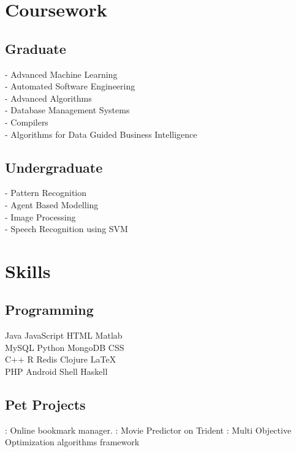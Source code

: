 \documentclass[]{bigfatnoob-resume}
\begin{document}
\begin{minipage}[t]{0.33\textwidth}

\section{Coursework}
\subsection{Graduate}
- Advanced Machine Learning \\
- Automated Software Engineering \\
- Advanced Algorithms \\
- Database Management Systems \\
- Compilers \\
- Algorithms for Data Guided Business Intelligence\\


\sectionsep

\subsection{Undergraduate}
- Pattern Recognition \\
- Agent Based Modelling \\
- Image Processing \\
- Speech Recognition using SVM\\
\sectionsep


\section{Skills}
\subsection{Programming}
Java \textbullet{} JavaScript\textbullet{} HTML \textbullet{} Matlab \\
MySQL \textbullet{} Python \textbullet{} MongoDB \textbullet{} CSS \\ 
C++ \textbullet{} R \textbullet{} Redis \textbullet{} Clojure \textbullet{} \LaTeX\ \\
PHP \textbullet{} Android \textbullet{} Shell \textbullet{} Haskell
\sectionsep

\subsection{Pet Projects}
\href{http://region.io}{}: Online bookmark manager.
\href{https://github.com/NCSU-Advanced-Algos/octorater}{}: Movie Predictor on Trident
\href{https://github.com/bigfatnoob/optima}{}: Multi Objective Optimization algorithms framework

%
%

\end{minipage} 
\end{document}
